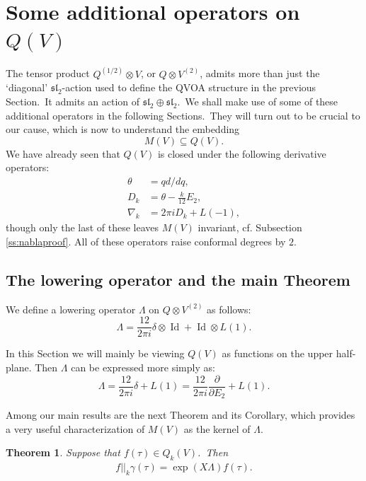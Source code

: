 \documentclass[12pt]{amsart}
\theoremstyle{plain}
\newtheorem{thm}{Theorem}[section]
\theoremstyle{definition}
\theoremstyle{remark}
\DeclareMathOperator{\Id}{Id}
\begin{document}
\section{Some additional operators on \texorpdfstring{$Q(V)$}{Q(V)}}
\label{s:operators}
 The tensor product $Q^{(1/2)}\otimes V$, or $Q\otimes V^{(2)}$, admits more than just the  `diagonal' $\mathfrak{sl}_2$-action used to define the QVOA structure in the previous Section.\ It admits an action of $\mathfrak{sl}_2\oplus\mathfrak{sl}_2$.\ We shall make use of some of these additional operators in the following Sections.\
 They will turn out to be crucial to our cause, which is now to understand the embedding
 $$M(V)\subseteq Q(V).$$
We have already seen that $Q(V)$ is closed under the following derivative operators:
\begin{align*}
    \theta &= qd/dq,\\
    D_k &= \theta - \tfrac{k}{12}E_2,\\
    \nabla_k &= 2\pi i D_k +L(-1),
\end{align*}
though only the last of these leaves $M(V)$ invariant, cf. Subsection \ref{ss:nablaproof}. All of these operators raise conformal degrees by $2$.

\subsection{The lowering operator and the main Theorem}
 \label{ss:lowering}
 We define a lowering operator $\Lambda$ on $Q\otimes V^{(2)}$ as follows:
$$\Lambda = \frac{12}{2\pi i}\delta\otimes \Id+\Id\otimes L(1).$$

\medskip
In this Section we will mainly be viewing $Q(V)$ as functions on the upper half-plane. Then $\Lambda$ can be expressed more simply as:
\begin{equation}
    \label{eq:loweringoperator}
    \Lambda = \frac{12}{2\pi i} \delta + L(1) = \frac{12}{2\pi i }\frac{\partial}{\partial E_2} +L(1).
\end{equation}

Among our main results are the next Theorem and its Corollary, which provides a very useful characterization of $M(V)$ as the kernel of $\Lambda$.
\begin{thm}\label{thmXLambda}
Suppose that $f(\tau)\in Q_k(V)$.\ Then
\begin{eqnarray}\label{Lambdaact}
f||_k\gamma(\tau) = \exp(X\Lambda)f(\tau).
\end{eqnarray}
\end{thm}
\end{document}
